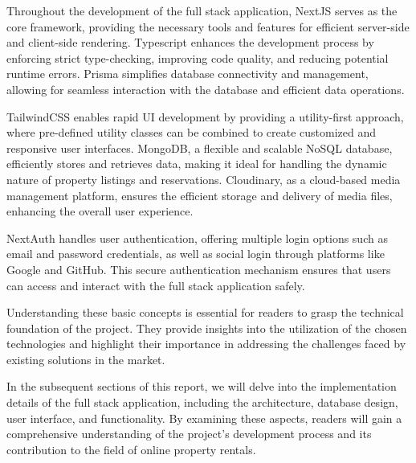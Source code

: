 Throughout the development of the full stack application, NextJS serves as the core framework, providing the necessary tools and features for efficient server-side and client-side rendering. Typescript enhances the development process by enforcing strict type-checking, improving code quality, and reducing potential runtime errors. Prisma simplifies database connectivity and management, allowing for seamless interaction with the database and efficient data operations.

TailwindCSS enables rapid UI development by providing a utility-first approach, where pre-defined utility classes can be combined to create customized and responsive user interfaces. MongoDB, a flexible and scalable NoSQL database, efficiently stores and retrieves data, making it ideal for handling the dynamic nature of property listings and reservations. Cloudinary, as a cloud-based media management platform, ensures the efficient storage and delivery of media files, enhancing the overall user experience.

NextAuth handles user authentication, offering multiple login options such as email and password credentials, as well as social login through platforms like Google and GitHub. This secure authentication mechanism ensures that users can access and interact with the full stack application safely.

Understanding these basic concepts is essential for readers to grasp the technical foundation of the project. They provide insights into the utilization of the chosen technologies and highlight their importance in addressing the challenges faced by existing solutions in the market.

In the subsequent sections of this report, we will delve into the implementation details of the full stack application, including the architecture, database design, user interface, and functionality. By examining these aspects, readers will gain a comprehensive understanding of the project's development process and its contribution to the field of online property rentals.
